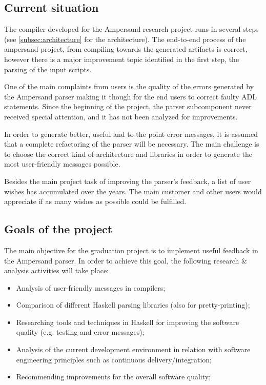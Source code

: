 \subsection{Current situation}
The compiler developed for the Ampersand research project runs in several steps (see \autoref{subsec:architecture} for the architecture).
The end-to-end process of the ampersand project, from compiling towards the generated artifacts is correct, however there is a major improvement topic identified in the first step, the parsing of the input scripts.

One of the main complaints from users is the quality of the errors generated by the Ampersand parser making it though for the end users to correct faulty ADL statements.
Since the beginning of the project, the parser subcomponent never received special attention, and it has not been analyzed for improvements.

In order to generate better, useful and to the point error messages, it is assumed that a complete refactoring of the parser will be necessary.
The main challenge is to choose the correct kind of architecture and libraries in order to generate the most user-friendly messages possible.

Besides the main project task of improving the parser's feedback, a list of user wishes has accumulated over the years.
The main customer and other users would appreciate if as many wishes as possible could be fulfilled.

\subsection{Goals of the project}
\label{subsec:project-goals}
The main objective for the graduation project is to implement useful feedback in the Ampersand parser.
In order to achieve this goal, the following research \& analysis activities will take place:
\begin{itemize}
	\item Analysis of user-friendly messages in compilers;
	\item Comparison of different Haskell parsing libraries (also for pretty-printing);
	\item Researching tools and techniques in Haskell for improving the software quality (e.g. testing and error messages);
	\item Analysis of the current development environment in relation with software engineering principles such as continuous delivery/integration;
	\item Recommending improvements for the overall software quality;
\end{itemize}
%

